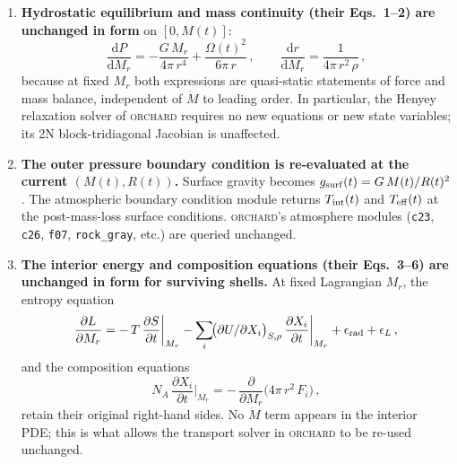 \documentclass{aastex701}
\newcommand{\dd}{\mathrm{d}}
\newcommand{\Mdot}{\dot{M}}
\newcommand{\orchard}{\textsc{orchard}}
\begin{document}
\begin{enumerate}
  \item \textbf{Hydrostatic equilibrium and mass continuity (their
        Eqs.~1--2) are unchanged in form} on $[0,M(t)]$:
        \begin{equation}\label{eq:hse}
          \frac{\dd P}{\dd M_{r}}
            = -\frac{G\,M_{r}}{4\pi\,r^{4}}
              + \frac{\Omega(t)^{2}}{6\pi\,r}\,,
          \qquad
          \frac{\dd r}{\dd M_{r}}
            = \frac{1}{4\pi\,r^{2}\,\rho}\,,
        \end{equation}
        because at fixed $M_{r}$ both expressions are quasi-static
        statements of force and mass balance, independent of
        $\Mdot$ to leading order.  In particular, the Henyey
        relaxation solver of \orchard{} requires no new equations
        or new state variables; its 2N block-tridiagonal Jacobian
        is unaffected.

  \item \textbf{The outer pressure boundary condition is re-evaluated
        at the current $(M(t),R(t))$.}  Surface gravity becomes
        $g_{\rm surf}(t) = G\,M(t)/R(t)^{2}$.  The atmospheric
        boundary condition module returns $T_{\rm int}(t)$ and
        $T_{\rm eff}(t)$ at the post-mass-loss surface conditions.
        \orchard{}'s atmosphere modules (\texttt{c23}, \texttt{c26},
        \texttt{f07}, \texttt{rock\_gray}, etc.) are queried unchanged.

  \item \textbf{The interior energy and composition equations (their
        Eqs.~3--6) are unchanged in form for surviving shells.}  At
        fixed Lagrangian $M_{r}$, the entropy equation
        \begin{equation}\label{eq:Lprime}
          \frac{\partial L}{\partial M_{r}}
            = -\,T\,\frac{\partial S}{\partial t}\bigg|_{M_{r}}
              -\sum_{i}\!\bigl(\partial U/\partial X_{i}\bigr)_{S,\rho}\,
                \frac{\partial X_{i}}{\partial t}\bigg|_{M_{r}}
              + \epsilon_{\rm rad} + \epsilon_{L}\,,
        \end{equation}
        and the composition equations
        \begin{equation}\label{eq:Xprime}
          N_{A}\,\frac{\partial X_{i}}{\partial t}\bigg|_{M_{r}}
            = -\,\frac{\partial}{\partial M_{r}}
              \!\bigl(4\pi\,r^{2}\,F_{i}\bigr)\,,
        \end{equation}
        retain their original right-hand sides.  No $\Mdot$ term
        appears in the interior PDE; this is what allows the
        transport solver in \orchard{} to be re-used unchanged.


\end{enumerate}
\end{document}
